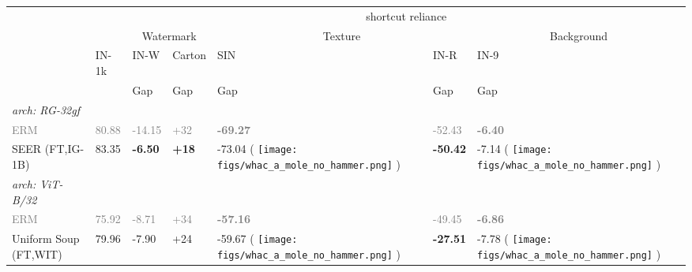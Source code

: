 \documentclass[10pt,twocolumn,letterpaper]{article}
\DeclareRobustCommand{\molenohammer}{\begingroup\normalfont
  \texttt{[image: figs/whac\_a\_mole\_no\_hammer.png]}\endgroup
}
\begin{document}
\begin{table}[t]
\centering
\begin{adjustbox}{width=\linewidth}
\begin{tabular}{@{}lllllll@{}}
\toprule
 &                            & \multicolumn{5}{|c}{shortcut reliance}                                                                                                               \\ \cmidrule(l){3-7}
 & \multicolumn{1}{c|}{}      & \multicolumn{2}{c|}{Watermark}                             & \multicolumn{2}{c|}{Texture}                          & \multicolumn{1}{c}{Background} \\
 & \multicolumn{1}{l|}{IN-1k} & IN-W  & \multicolumn{1}{l|}{Carton } & SIN  & \multicolumn{1}{l|}{IN-R } & IN-9                 \\
 & \multicolumn{1}{l|}{}      & Gap             & \multicolumn{1}{l|}{Gap}                 & Gap            & \multicolumn{1}{l|}{Gap}             & Gap                            \\  \midrule
\textit{arch: RG-32gf}                   &                    &          &           &          &         &                 \\
\textcolor{gray}{ERM}                  & \textcolor{gray}{80.88}                   & \textcolor{gray}{-14.15}           & \textcolor{gray}{+32}          & \textcolor{gray}{\textbf{-69.27}}          & \textcolor{gray}{-52.43}          & \textcolor{gray}{\textbf{-6.40}}                  \\
SEER \scriptsize{(FT,IG-1B)}                 & 83.35          & \textbf{-6.50}   & \textbf{+18} & -73.04 \scriptsize{(\textcolor{red}{} \molenohammer)}         & \textbf{-50.42}          & -7.14 \scriptsize{(\textcolor{red}{} \molenohammer)}                          \\ \midrule
\textit{arch: ViT-B/32}                   &                    &          &           &          &         &                 \\
\textcolor{gray}{ERM}                & \textcolor{gray}{75.92}                  & \textcolor{gray}{-8.71}            & \textcolor{gray}{+34}          & \textcolor{gray}{\textbf{-57.16}}          & \textcolor{gray}{-49.45}          & \textcolor{gray}{\textbf{-6.86}}                 \\
Uniform Soup \scriptsize{(FT,WIT)}      & 79.96         & -7.90   & +24 & -59.67 \scriptsize{(\textcolor{red}{} \molenohammer)} & \textbf{-27.51} & -7.78  \scriptsize{(\textcolor{red}{} \molenohammer)}      \\

\end{tabular}
\end{adjustbox}
\end{table}
\end{document}
